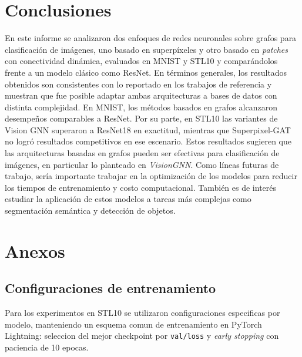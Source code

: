 \documentclass{article}
\begin{document}
\section{Conclusiones}
\label{sec:conclusiones}
En este informe se analizaron dos enfoques de redes neuronales sobre grafos para clasificación de imágenes, uno basado en superpíxeles y otro basado en \textit{patches} con conectividad dinámica, evaluados en MNIST y STL10 y comparándolos frente a un modelo clásico como ResNet. En términos generales, los resultados obtenidos son consistentes con lo reportado en los trabajos de referencia y muestran que fue posible adaptar ambas arquitecturas a bases de datos con distinta complejidad. En MNIST, los métodos basados en grafos alcanzaron desempeños comparables a ResNet. Por su parte, en STL10 las variantes de Vision GNN superaron a ResNet18 en exactitud, mientras que Superpixel-GAT no logró resultados competitivos en ese escenario. Estos resultados sugieren que las arquitecturas basadas en grafos pueden ser efectivas para clasificación de imágenes, en particular lo planteado en \textit{VisionGNN}. Como líneas futuras de trabajo, sería importante trabajar en la optimización de los modelos para reducir los tiempos de entrenamiento y costo computacional. También es de interés estudiar la aplicación de estos modelos a tareas más complejas como segmentación semántica y detección de objetos.




\section{Anexos}

\subsection{Configuraciones de entrenamiento}

Para los experimentos en STL10 se utilizaron configuraciones especificas por modelo, manteniendo un esquema comun de entrenamiento en PyTorch Lightning: seleccion del mejor checkpoint por \texttt{val/loss} y \textit{early stopping} con paciencia de 10 epocas.
\end{document}
